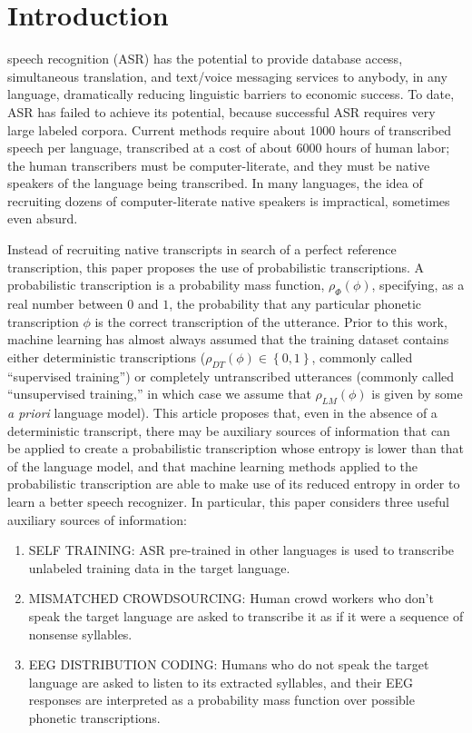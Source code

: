 \section{Introduction}

 speech recognition (ASR) has the potential to provide
database access, simultaneous translation, and text/voice messaging
services to anybody, in any language, dramatically reducing linguistic
barriers to economic success.  To date, ASR has failed to achieve its
potential, because successful ASR requires very large labeled
corpora. Current methods require about 1000 hours of transcribed
speech per language, transcribed at a cost of about 6000 hours of
human labor; the human transcribers must be computer-literate, and
they must be native speakers of the language being transcribed.  In
many languages, the idea of recruiting dozens of computer-literate
native speakers is impractical, sometimes even absurd.

Instead of recruiting native transcripts in search of a perfect
reference transcription, this paper proposes the use of probabilistic
transcriptions.  A probabilistic transcription is a probability mass
function, $\rho_\Phi(\phi)$, specifying, as a real number between $0$ and
$1$, the probability that any particular phonetic transcription $\phi$
is the correct transcription of the utterance.  Prior to this work,
machine learning has almost always assumed that the training dataset
contains either deterministic transcriptions
($\rho_{DT}(\phi)\in\left\{0,1\right\}$, commonly called ``supervised
training'') or completely untranscribed utterances (commonly called
``unsupervised training,'' in which case we assume that $\rho_{LM}(\phi)$
is given by some {\em a priori} language model).  This article
proposes that, even in the absence of a deterministic transcript,
there may be auxiliary sources of information that can be applied to
create a probabilistic transcription whose entropy is lower than that
of the language model, and that machine learning methods applied to
the probabilistic transcription are able to make use of its reduced
entropy in order to learn a better speech recognizer.  In particular,
this paper considers three useful auxiliary sources of information:
\begin{enumerate}
\item SELF TRAINING: ASR pre-trained in other languages is used to
  transcribe unlabeled training data in the target language.
\item MISMATCHED CROWDSOURCING: Human crowd workers who don't speak
  the target language are asked to transcribe it as if it were a
  sequence of nonsense syllables.
\item EEG DISTRIBUTION CODING: Humans who do not speak the target
  language are asked to listen to its extracted syllables, and their
  EEG responses are interpreted as a probability mass function over
  possible phonetic transcriptions.
\end{enumerate}

